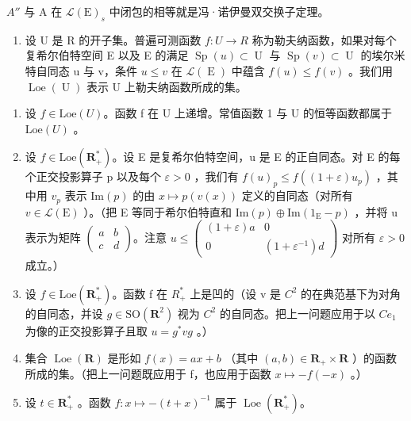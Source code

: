 \(A''\) 与 A 在 \(\mathcal{L}(\mathrm{E})_s\) 中闭包的相等就是冯·诺伊曼双交换子定理。

\begin{enumerate}
\def\labelenumi{\arabic{enumi})}
\setcounter{enumi}{24}
\tightlist
\item
  设 U 是 R 的开子集。普遍可测函数 \(f: U \to R\) 称为勒夫纳函数，如果对每个复希尔伯特空间 E 以及 E 的满足 \(\operatorname{Sp}(u) \subset \operatorname{U}\) 与 \(\operatorname{Sp}(v) \subset \operatorname{U}\) 的埃尔米特自同态 u 与 v，条件 \(u \leqslant v\) 在 \(\mathcal{L}(\operatorname{E})\) 中蕴含 \(f(u) \leqslant f(v)\) 。我们用 \(\operatorname{Loe}(\operatorname{U})\) 表示 U 上勒夫纳函数所成的集。
\end{enumerate}

\begin{enumerate}
\def\labelenumi{\alph{enumi})}
\item
  设 \(f \in \text{Loe}(U)\)。函数 f 在 U 上递增。常值函数 1 与 U 的恒等函数都属于 \(\text{Loe}(U)\) 。
\item
  设 \(f \in \text{Loe}(\mathbf{R}_+^*)\)。设 E 是复希尔伯特空间，u 是 E 的正自同态。对 E 的每个正交投影算子 p 以及每个 \(\varepsilon > 0\) ，我们有 \(f(u)_p \leqslant f((1 + \varepsilon)u_p)\) ，其中用 \(v_p\) 表示 \(\text{Im}(p)\) 的由 \(x \mapsto p(v(x))\) 定义的自同态（对所有 \(v \in \mathcal{L}(\text{E})\) ）。（把 E 等同于希尔伯特直和 \(\text{Im}(p) \oplus \text{Im}(1_{\text{E}} - p)\) ，并将 u 表示为矩阵 \(\begin{pmatrix} a & b \\ c & d \end{pmatrix}\)。注意 \(u \leqslant \begin{pmatrix} (1 + \varepsilon)a & 0 \\ 0 & (1 + \varepsilon^{-1})d \end{pmatrix}\) 对所有 \(\varepsilon > 0\) 成立。）
\item
  设 \(f \in \text{Loe}(\mathbf{R}_{+}^{*})\)。函数 f 在 \(R_{+}^{*}\) 上是凹的（设 v 是 \(C^{2}\) 的在典范基下为对角的自同态，并设 \(g \in \text{SO}(\mathbf{R}^{2})\) 视为 \(C^{2}\) 的自同态。把上一问题应用于以 \(Ce_{1}\) 为像的正交投影算子且取 \(u = g^{*}vg\) 。）
\item
  集合 \(\operatorname{Loe}(\mathbf{R})\) 是形如 \(f(x)=ax+b\) （其中 \((a,b)\in\mathbf{R}_{+}\times\mathbf{R}\) ）的函数所成的集。（把上一问题既应用于 f，也应用于函数 \(x\mapsto-f(-x)\) 。）
\item
  设 \(t \in \mathbf{R}_{+}^{*}\) 。函数 \(f: x \mapsto -(t + x)^{-1}\) 属于 \(\operatorname{Loe}(\mathbf{R}_{+}^{*})\)。
\end{enumerate}

